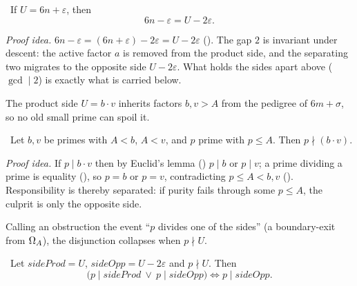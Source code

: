 \begin{theorem}\label{thm:two_carry_opposite}
\green{}\ If $U=6n+\varepsilon$, then
\begin{equation}\label{eq:two-carry}
6n-\varepsilon=U-2\varepsilon.
\end{equation}
\end{theorem}

\emph{Proof idea.} $6n-\varepsilon=(6n+\varepsilon)-2\varepsilon=U-2\varepsilon$
(). The gap $2$ is invariant under descent: the active factor $a$ is
removed from the product side, and the separating two migrates to the opposite side $U-2\varepsilon$.
What holds the sides apart above ($\gcd\mid 2$) is exactly what is carried below.

The product side $U=b\cdot v$ inherits factors $b,v>A$ from the pedigree of $6m+\sigma$, so no old
small prime can spoil it.

\begin{theorem}\label{thm:no_small_divisor}
\green{}\ Let $b,v$ be primes with $A<b$, $A<v$, and $p$ prime with $p\le A$. Then $p\nmid(b\cdot v)$.
\end{theorem}

\emph{Proof idea.} If $p\mid b\cdot v$ then by Euclid's lemma () $p\mid b$
or $p\mid v$; a prime dividing a prime is equality (), so $p=b$
or $p=v$, contradicting $p\le A<b,v$ (). Responsibility is thereby separated: if purity
fails through some $p\le A$, the culprit is only the opposite side.

Calling an obstruction the event ``$p$ divides one of the sides'' (a boundary-exit from $\Omega_A$),
the disjunction collapses when $p\nmid U$.

\begin{theorem}\label{thm:obstruction_on_opposite}
\green{}\ Let $\mathit{sideProd}=U$, $\mathit{sideOpp}=U-2\varepsilon$ and $p\nmid U$. Then
\begin{equation}\label{eq:obstruction}
\bigl(p\mid\mathit{sideProd}\ \lor\ p\mid\mathit{sideOpp}\bigr)\iff p\mid\mathit{sideOpp}.
\end{equation}
\end{theorem}

